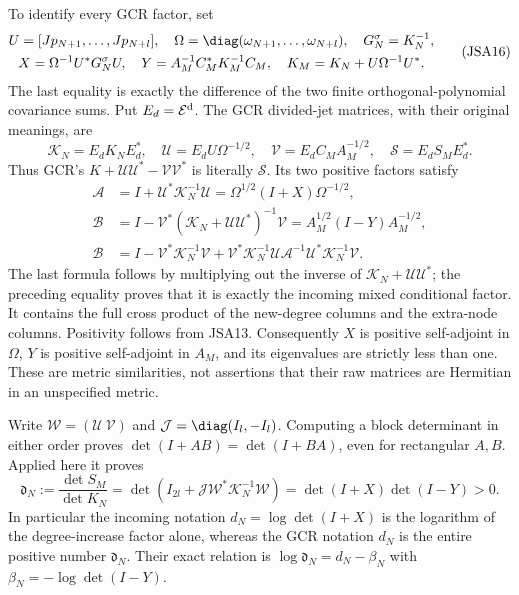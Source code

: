 To identify every GCR factor, set
\[
\begin{gathered}
 U=[Jp_{N+1},\ldots,Jp_{N+l}],\quad
 \Omega=\diag(\omega_{N+1},\ldots,\omega_{N+l}),\quad
 G_N^\sigma=K_N^{-1},\\
 X=\Omega^{-1}U^*G_N^\sigma U,\quad
 Y=A_M^{-1}C_M^*K_M^{-1}C_M,\quad
 K_M=K_N+U\Omega^{-1}U^*.
\end{gathered}\tag{JSA16}
\]
The last equality is exactly the difference of the two finite
orthogonal-polynomial covariance sums. Put $E_d=\mathcal E^{\rm d}$.
The GCR divided-jet matrices, with their original meanings, are
\[
 \mathcal K_N=E_dK_NE_d^*,\quad
 \mathcal U=E_dU\Omega^{-1/2},\quad
 \mathcal V=E_dC_MA_M^{-1/2},\quad
 \mathcal S=E_dS_ME_d^*.
\tag{JSA17}
\]
Thus GCR's $K+\mathcal U\mathcal U^*-\mathcal V\mathcal V^*$
is literally $\mathcal S$. Its two positive factors satisfy
\[
\begin{aligned}
 \mathcal A&=I+\mathcal U^*\mathcal K_N^{-1}\mathcal U
    =\Omega^{1/2}(I+X)\Omega^{-1/2},\\
 \mathcal B&=I-\mathcal V^*(\mathcal K_N+
                        \mathcal U\mathcal U^*)^{-1}\mathcal V
    =A_M^{1/2}(I-Y)A_M^{-1/2},\\
 \mathcal B&=I-\mathcal V^*\mathcal K_N^{-1}\mathcal V
   +\mathcal V^*\mathcal K_N^{-1}\mathcal U\mathcal A^{-1}
                   \mathcal U^*\mathcal K_N^{-1}\mathcal V.
\end{aligned}\tag{JSA18}
\]
The last formula follows by multiplying out the inverse of
$\mathcal K_N+\mathcal U\mathcal U^*$; the preceding equality
proves that it is exactly the incoming mixed conditional factor.
It contains the full cross product of the new-degree columns and
the extra-node columns. Positivity follows from JSA13.
Consequently $X$ is positive self-adjoint in $\Omega$, $Y$ is
positive self-adjoint in $A_M$, and its eigenvalues are strictly
less than one. These are metric similarities, not assertions
that their raw matrices are Hermitian in an unspecified metric.

Write $\mathcal W=(\mathcal U\ \mathcal V)$ and
$\mathcal J=\diag(I_l,-I_l)$. Computing a block determinant
in either order proves $\det(I+AB)=\det(I+BA)$, even for
rectangular $A,B$. Applied here it proves
\[
 \mathfrak d_N:=\frac{\det S_M}{\det K_N}
 =\det(I_{2l}+\mathcal J\mathcal W^*\mathcal K_N^{-1}\mathcal W)
 =\det(I+X)\det(I-Y)>0.
\tag{JSA19}
\]
In particular the incoming notation $d_N=\log\det(I+X)$
is the logarithm of the degree-increase factor alone, whereas
the GCR notation $d_N$ is the entire positive number
$\mathfrak d_N$. Their exact relation is
$\log\mathfrak d_N=d_N-\beta_N$ with
$\beta_N=-\log\det(I-Y)$.

